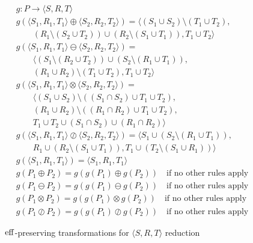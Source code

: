 \begin{figure}[t]
\centering
\begin{footnotesize}
\[
\begin{array}{l}
  g : P \rightarrow \langle S, R, T \rangle \\
  g (\langle S_1, R_1, T_1 \rangle \oplus \langle S_2, R_2, T_2 \rangle) = 
  \langle 
  (S_1 \cup S_2) \setminus (T_1 \cup T_2), \\
  \qquad (R_1 \setminus (S_2 \cup T_2)) \cup (R_2 \setminus (S_1 \cup T_1)), 
  T_1 \cup T_2 
  \rangle \\
  g (\langle S_1, R_1, T_1 \rangle \ominus \langle S_2, R_2, T_2 \rangle)
  =  \\
  \qquad \langle (S_1 \setminus (R_2 \cup T_2)) \cup 
  (S_2 \setminus (R_1 \cup T_1)), \\
  \qquad
  (R_1 \cup R_2) \setminus (T_1 \cup T_2), 
  T_1 \cup T_2 
  \rangle
  \\
  g (\langle S_1, R_1, T_1 \rangle \otimes \langle S_2, R_2, T_2 \rangle)
  = \\
  \qquad \langle 
  (S_1 \cup S_2) \setminus ((S_1 \cap S_2) \cup T_1 \cup T_2), \\
  \qquad
  (R_1 \cup R_2) \setminus ((R_1 \cap R_2) \cup T_1 \cup T_2), \\
  \qquad
  T_1 \cup T_2 \cup (S_1 \cap S_2) \cup (R_1 \cap R_2)
  \rangle 
  \\
  g (\langle S_1, R_1, T_1 \rangle \oslash \langle S_2, R_2, T_2 \rangle)
  = \langle 
  S_1 \cup (S_2 \setminus (R_1 \cup T_1)), \\
  \qquad 
  R_1 \cup (R_2 \setminus (S_1 \cup T_1)), 
  T_1 \cup (T_2 \setminus (S_1 \cup R_1))
  \rangle
  \\
  g (\langle S_1, R_1, T_1 \rangle) = \langle  S_1, R_1, T_1 \rangle 
  \\
  g (P_1 \oplus P_2) =  g (g (P_1) \oplus g (P_2)) \quad 
  \text{if no other rules apply}  \\
  g (P_1 \ominus P_2) =  g (g (P_1) \ominus g (P_2)) \quad 
  \text{if no other rules apply}  \\
  g (P_1 \otimes P_2) =  g (g (P_1) \otimes g (P_2)) \quad 
  \text{if no other rules apply}  \\
  g (P_1 \oslash P_2) =  g (g (P_1) \oslash g (P_2)) \quad
  \text{if no other rules apply} 
\end{array}
\]
\end{footnotesize}
\caption{$\operatorname{eff}$-preserving transformations for $\langle S, R, T \rangle$ 
  reduction}
\label{fig:triplereduction}
\end{figure}

